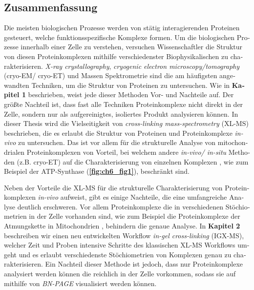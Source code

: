 \begin{otherlanguage}{german}
    \section{Zusammenfassung}
    Die meisten biologischen Prozesse werden von stätig interagierenden Proteinen gesteuert, welche funktionsspezifische Komplexe formen. Um die biologischen Prozesse innerhalb einer Zelle zu verstehen, versuchen Wissenschaftler die Struktur von diesen Proteinkomplexen mithilfe verschiedenster Biophysikalischen zu charakterisieren. \emph{X-ray crystallography}, \emph{cryogenic electron microscopy/tomography} (cryo-EM/ cryo-ET) und Massen Spektrometrie sind die am häufigsten angewandten Techniken, um die Struktur von Proteinen zu untersuchen. Wie in \textbf{Kapitel 1} beschrieben, weist jede dieser Methoden Vor- und Nachteile auf. Der größte Nachteil ist, dass fast alle Techniken Proteinkomplexe nicht direkt in der Zelle, sondern nur als aufgereinigtes, isoliertes Produkt analysieren können. In dieser Thesis wird die Vielseitigkeit von \emph{cross-linking mass-spectrometry} (XL-MS) beschrieben, die es erlaubt die Struktur von Proteinen und Proteinkomplexe \emph{in-vivo} zu untersuchen. Das ist vor allem für die strukturelle Analyse von mitochondrialen Proteinkomplexen von Vorteil, bei welchem andere \emph{in-vivo/ in-situ} Methoden (z.B. cryo-ET) auf die Charakterisierung von einzelnen Komplexen \cite{RN1}, wie zum Beispiel der ATP-Synthase (\textbf{\autoref{fig:ch6_fig1}}), beschränkt sind.

    Neben der Vorteile die XL-MS für die strukturelle Charakterisierung von Proteinkomplexen \emph{in-vivo} aufweist, gibt es einige Nachteile, die eine umfangreiche Analyse deutlich erschweren. Vor allem Proteinkomplexe die in verschiedenen Stöchiometrien in der Zelle vorhanden sind, wie zum Beispiel die Proteinkomplexe der Atmungskette in Mitochondrien \cite{RN3}, behindern die genaue Analyse. In \textbf{Kapitel 2} beschreiben wir einen neu entwickelten Workflow \emph{in-gel cross-linking} (IGX-MS), welcher Zeit und Proben intensive Schritte des klassischen XL-MS Workflows umgeht und es erlaubt verschiedenste Stöchiometrien von Komplexen genau zu charakterisieren. Ein Nachteil dieser Methode ist jedoch, dass nur Proteinkomplexe analysiert werden können die reichlich in der Zelle vorkommen, sodass sie auf mithilfe von \emph{BN-PAGE} visualisiert werden können.


\end{otherlanguage}
